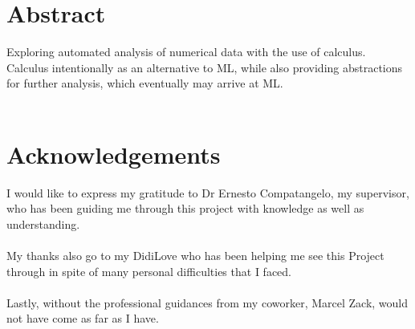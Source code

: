 \documentclass[main.tex]{subfiles}
\begin{document}
  \pagestyle{plain}
  
  \begingroup
    \fontsize{8pt}{10pt}\selectfont
    
    \section*{Abstract}
  
    \lipsum[1]
    Exploring automated analysis of numerical data with the use of calculus. \\
    Calculus intentionally as an alternative to ML, while also providing abstractions for further analysis, which eventually may arrive at ML.
    \\\\
    
  
  \endgroup
  \hrulefill
  
  \section*{Acknowledgements}
    
    I would like to express my gratitude to Dr Ernesto Compatangelo, my supervisor, who has been guiding me through this project with knowledge as well as understanding.
    \\\\
    My thanks also go to my DidiLove who has been helping me see this Project through in spite of many personal difficulties that I faced.
    \\\\
    Lastly, without the professional guidances from my coworker, Marcel Zack,  would not have come as far as I have.
  
\end{document}
